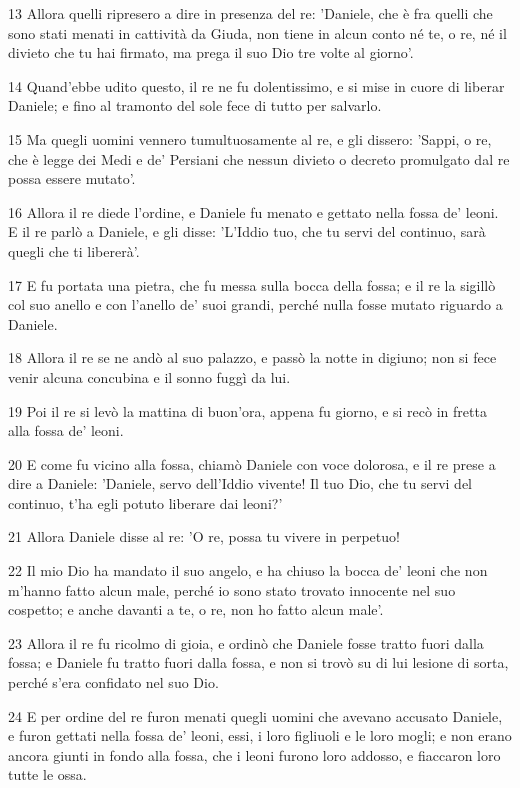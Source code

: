 \par 13 Allora quelli ripresero a dire in presenza del re: 'Daniele, che è fra quelli che sono stati menati in cattività da Giuda, non tiene in alcun conto né te, o re, né il divieto che tu hai firmato, ma prega il suo Dio tre volte al giorno'.
\par 14 Quand'ebbe udito questo, il re ne fu dolentissimo, e si mise in cuore di liberar Daniele; e fino al tramonto del sole fece di tutto per salvarlo.
\par 15 Ma quegli uomini vennero tumultuosamente al re, e gli dissero: 'Sappi, o re, che è legge dei Medi e de' Persiani che nessun divieto o decreto promulgato dal re possa essere mutato'.
\par 16 Allora il re diede l'ordine, e Daniele fu menato e gettato nella fossa de' leoni. E il re parlò a Daniele, e gli disse: 'L'Iddio tuo, che tu servi del continuo, sarà quegli che ti libererà'.
\par 17 E fu portata una pietra, che fu messa sulla bocca della fossa; e il re la sigillò col suo anello e con l'anello de' suoi grandi, perché nulla fosse mutato riguardo a Daniele.
\par 18 Allora il re se ne andò al suo palazzo, e passò la notte in digiuno; non si fece venir alcuna concubina e il sonno fuggì da lui.
\par 19 Poi il re si levò la mattina di buon'ora, appena fu giorno, e si recò in fretta alla fossa de' leoni.
\par 20 E come fu vicino alla fossa, chiamò Daniele con voce dolorosa, e il re prese a dire a Daniele: 'Daniele, servo dell'Iddio vivente! Il tuo Dio, che tu servi del continuo, t'ha egli potuto liberare dai leoni?'
\par 21 Allora Daniele disse al re: 'O re, possa tu vivere in perpetuo!
\par 22 Il mio Dio ha mandato il suo angelo, e ha chiuso la bocca de' leoni che non m'hanno fatto alcun male, perché io sono stato trovato innocente nel suo cospetto; e anche davanti a te, o re, non ho fatto alcun male'.
\par 23 Allora il re fu ricolmo di gioia, e ordinò che Daniele fosse tratto fuori dalla fossa; e Daniele fu tratto fuori dalla fossa, e non si trovò su di lui lesione di sorta, perché s'era confidato nel suo Dio.
\par 24 E per ordine del re furon menati quegli uomini che avevano accusato Daniele, e furon gettati nella fossa de' leoni, essi, i loro figliuoli e le loro mogli; e non erano ancora giunti in fondo alla fossa, che i leoni furono loro addosso, e fiaccaron loro tutte le ossa.

